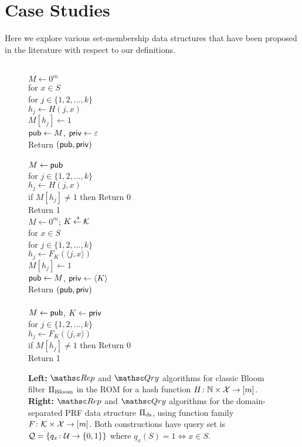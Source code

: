 \section{Case Studies}
Here we explore various set-membership data structures that have been proposed
in the literature with respect to our definitions.


\begin{figure}[tp]
\centering
{}
{
\\
$M \gets 0^m$\\
for $x \in S$\\
\nudge for $j \in \{1,2,\ldots,k\}$\\
\nudge\nudge $h_j \gets H(j,x)$\\
\nudge\nudge $M[h_j] \gets 1$\\
${\sf pub} \gets M$, ${\sf priv} \gets \varepsilon$\\
Return $({\sf pub},{\sf priv})$\\

\medskip
{}\\
$M\gets{\sf pub}$\\
for $j \in \{1,2,\ldots,k\}$\\
\nudge $h_j \gets H(j,x)$\\
\nudge if $M[h_j] \neq 1$ then Return 0\\
Return 1
}
{
\\
$M \gets 0^m$; $K {\:\stackrel{{\scriptscriptstyle \hspace{0.2em}\$}} {\leftarrow}\:} {\cal K}$\\
for $x \in S$\\
\nudge for $j \in \{1,2,\ldots,k\}$\\
\nudge\nudge $h_j \gets F_{K}(\langle j,x \rangle) $\\
\nudge\nudge $M[h_j] \gets 1$\\
${\sf pub} \gets M$, ${\sf priv} \gets \langle K \rangle$\\
Return $({\sf pub},{\sf priv})$\\

\medskip
{}\\
$M\gets{\sf pub}$, $K \gets {\sf priv}$\\
for $j \in \{1,2,\ldots,k\}$\\
\nudge $h_j \gets F_{K}(\langle j,x \rangle) $\\
\nudge if $M[h_j] \neq 1$ then Return 0\\
Return 1
}
\caption{{\bf Left:} $\Rep$ and $\Qry$ algorithms for classic Bloom
  filter $\Pi_{\mathrm{Bloom}}$ in the ROM for a hash function $H\colon \mathbb{N} \times
  {\cal X} \to [m]$. {\bf Right:} $\Rep$ and $\Qry$
  algorithms for the domain-separated PRF data structure
  $\Pi_{\mathrm{ds}}$, using function family $F \colon
  {\cal K} \times {\cal X} \to [m]$.  Both constructions have query set is ${\cal Q}=\{q_x\colon
  {\cal U} \to \{0,1\}\}$ where $q_x(S)=1 \Leftrightarrow x \in S$.  }
\label{fig:bf-and-lin}
\end{figure}

